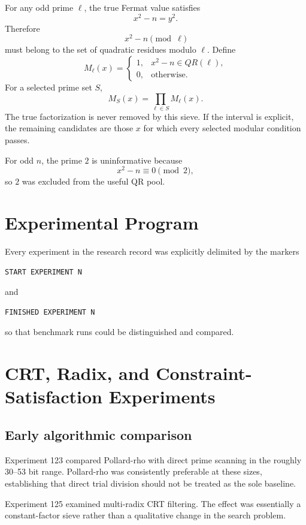 \documentclass[11pt,a4paper]{article}
\begin{document}
For any odd prime $\ell$, the true Fermat value satisfies
\[
 x^2-n=y^2.
\]
Therefore
\[
 x^2-n \pmod \ell
\]
must belong to the set of quadratic residues modulo $\ell$. Define
\[
 M_\ell(x)=
 \begin{cases}
 1,&x^2-n\in QR(\ell),\\
 0,&\text{otherwise}.
 \end{cases}
\]
For a selected prime set $S$,
\begin{equation}
 M_S(x)=\prod_{\ell\in S}M_\ell(x).
\label{eq:qrmask}
\end{equation}
The true factorization is never removed by this sieve. If the interval is explicit, the remaining candidates are those $x$ for which every selected modular condition passes.

For odd $n$, the prime $2$ is uninformative because
\[
 x^2-n\equiv0\pmod2,
\]
so $2$ was excluded from the useful QR pool.

\section{Experimental Program}

Every experiment in the research record was explicitly delimited by the markers
\begin{verbatim}
START EXPERIMENT N
\end{verbatim}
and
\begin{verbatim}
FINISHED EXPERIMENT N
\end{verbatim}
so that benchmark runs could be distinguished and compared.

\section{CRT, Radix, and Constraint-Satisfaction Experiments}

\subsection{Early algorithmic comparison}

Experiment 123 compared Pollard-rho with direct prime scanning in the roughly 30--53 bit range. Pollard-rho was consistently preferable at these sizes, establishing that direct trial division should not be treated as the sole baseline.

Experiment 125 examined multi-radix CRT filtering. The effect was essentially a constant-factor sieve rather than a qualitative change in the search problem.
\end{document}
